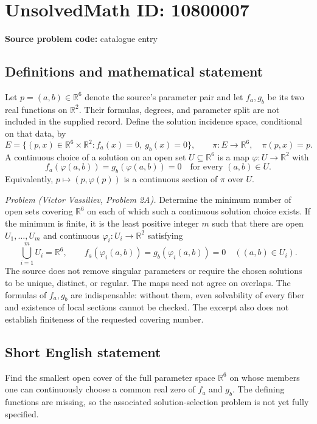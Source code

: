 \documentclass[11pt]{article}
\newcommand{\R}{\mathbb{R}}
\begin{document}
\section*{UnsolvedMath ID: 10800007}
\textbf{Source problem code:} catalogue entry
\subsection{Definitions and mathematical statement}
Let \(p=(a,b)\in\R^6\) denote the source's parameter pair and let \(f_a,g_b\) be its two real functions on \(\R^2\). Their formulas, degrees, and parameter split are not included in the supplied record. Define the solution incidence space, conditional on that data, by
\[
 E=\{(p,x)\in\R^6\times\R^2:f_a(x)=0,\ g_b(x)=0\},
 \qquad\pi:E\to\R^6,\quad\pi(p,x)=p.
\]
A continuous choice of a solution on an open set \(U\subseteq\R^6\) is a map \(\varphi:U\to\R^2\) with
\[
 f_a(\varphi(a,b))=g_b(\varphi(a,b))=0
 \quad\text{for every }(a,b)\in U.
\]
Equivalently, \(p\mapsto(p,\varphi(p))\) is a continuous section of \(\pi\) over \(U\).

\emph{Problem (Victor Vassiliev, Problem 2A).} Determine the minimum number of open sets covering \(\R^6\) on each of which such a continuous solution choice exists. If the minimum is finite, it is the least positive integer \(m\) such that there are open \(U_1,\ldots,U_m\) and continuous \(\varphi_i:U_i\to\R^2\) satisfying
\[
 \bigcup_{i=1}^{m}U_i=\R^6,\qquad
 f_a(\varphi_i(a,b))=g_b(\varphi_i(a,b))=0
 \quad((a,b)\in U_i).
\]
The source does not remove singular parameters or require the chosen solutions to be unique, distinct, or regular. The maps need not agree on overlaps. The formulas of \(f_a,g_b\) are indispensable: without them, even solvability of every fiber and existence of local sections cannot be checked. The excerpt also does not establish finiteness of the requested covering number.
\subsection{Short English statement}
Find the smallest open cover of the full parameter space \(\R^6\) on whose members one can continuously choose a common real zero of \(f_a\) and \(g_b\). The defining functions are missing, so the associated solution-selection problem is not yet fully specified.
\end{document}
